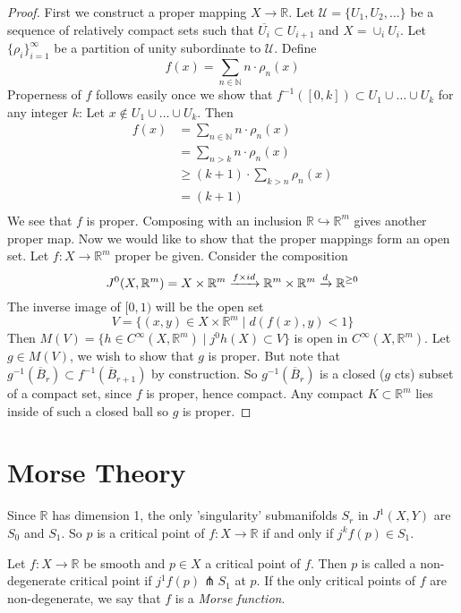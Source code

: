 \documentclass[12pt]{article}
\newcommand{\RR}{\mathbb{R}}
\begin{document}
\begin{proof}
    First we construct a proper mapping $X \to \RR$. Let $\mathcal{U} = \{U_1, U_2, \dots\}$ be a sequence of relatively compact sets such that $\overline{U_i} \subset U_{i+1}$ and $X = \cup_i U_i$. Let $\{\rho_i \}_{i=1}^\infty$ be a partition of unity subordinate to $\mathcal{U}$. Define
    $$
    f(x) = \sum_{n\in \mathbb{N}} n\cdot \rho_n(x)
    $$
    Properness of $f$ follows easily once we show that $f^{-1}([0, k]) \subset U_1 \cup \dots \cup U_k$ for any integer $k$: Let $x\not \in U_1 \cup \dots \cup U_k$. Then
    \begin{align*}
        f(x) & = \sum_{n\in \mathbb{N}} n\cdot \rho_n(x) \\ 
        & = \sum_{n>k} n\cdot \rho_n(x) \\ 
        & \geq (k+1) \cdot \sum_{k>n} \rho_n(x) \\ 
        & = (k+1) \\
    \end{align*}
    We see that $f$ is proper. Composing with an inclusion $\RR \hookrightarrow \RR^m$ gives another proper map. Now we would like to show that the proper mappings form an open set. Let $f: X \to \RR^m$ proper be given. Consider the composition
    $$
    J^0(X, \RR^m) = X\times \RR^m \xrightarrow{f\times id} \RR^m \times \RR^m \xrightarrow{d} \RR^{\geq 0} \\
    $$
    The inverse image of $[0, 1)$ will be the open set
    $$
    V = \{ (x, y) \in X\times \RR^m \mid d(f(x), y) < 1\}
    $$
    Then $M(V) = \{ h\in C^\infty(X, \RR^m) \mid j^0 h(X) \subset V\}$ is open in $C^\infty(X, \RR^m)$. Let $g\in M(V)$, we wish to show that $g$ is proper. But note that $g^{-1}(\overline{B}_r) \subset f^{-1}(\overline{B}_{r+1})$ by construction. So $g^{-1}(\overline{B}_r)$ is a closed ($g$ cts) subset of a compact set, since $f$ is proper, hence compact. Any compact $K \subset \RR^m$ lies inside of such a closed ball so $g$ is proper. 
\end{proof}




\section{Morse Theory}
Since $\RR$ has dimension 1, the only 'singularity' submanifolds $S_r$ in $J^1(X, Y)$ are $S_0$ and $S_1$. So $p$ is a critical point of $f: X \to \RR$ if and only if $j^kf(p) \in S_1$. 

\begin{definition}
    Let $f:X \to \RR$ be smooth and $p\in X$ a critical point of $f$. Then $p$ is called a non-degenerate critical point if $j^1 f (p) \pitchfork S_1$ at $p$. If the only critical points of $f$ are non-degenerate, we say that $f$ is a \emph{Morse function}. 
\end{definition}
\end{document}
